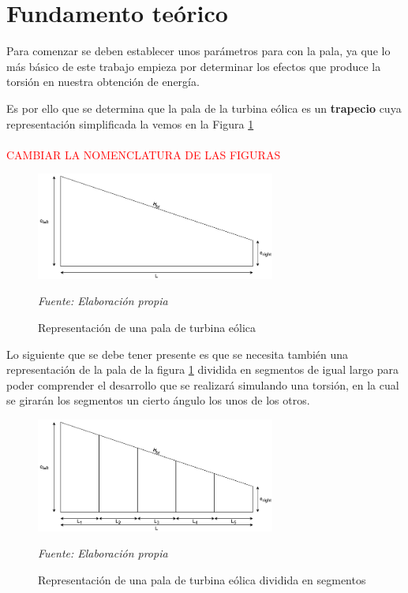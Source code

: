 \section{Fundamento teórico}

Para comenzar se deben establecer unos parámetros para con la pala, ya que lo más básico de este trabajo empieza por determinar los efectos que produce la torsión en nuestra obtención de energía.

Es por ello que se determina que la pala de la turbina eólica es un \textbf{trapecio} cuya representación simplificada la vemos en la Figura \ref{fig:pala_simp} \\\\


\textcolor{red}{\Large{CAMBIAR LA NOMENCLATURA DE LAS FIGURAS}}

\begin{figure}[H]
    \centering
    \includegraphics[width=0.7\textwidth]{images/pala simple.png}
    \caption{Representación de una pala de turbina eólica}
    \textit{Fuente: Elaboración propia}
    \label{fig:pala_simp}
\end{figure}



Lo siguiente que se debe tener presente es que se necesita también una representación de la pala de la figura \ref{fig:pala_simp} dividida en segmentos de igual largo para poder comprender el desarrollo que se realizará simulando una torsión, en la cual se girarán los segmentos un cierto ángulo los unos de los otros.

    \textbf{}
    \begin{figure}[H]
    \centering
    \includegraphics[width=0.7\textwidth]{images/pala simple segmentada.png}
    \caption{Representación de una pala de turbina eólica dividida en segmentos}
    \textit{Fuente: Elaboración propia}
    \label{fig:pala_dividida}
\end{figure}

